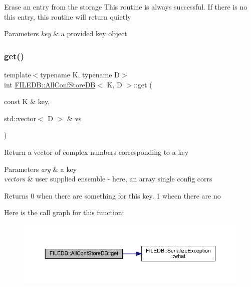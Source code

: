 Erase an entry from the storage This routine is always successful. If there is no this entry, this routine will return quietly 
\begin{DoxyParams}{Parameters}
{\em key} & a provided key object \\
\hline
\end{DoxyParams}
\mbox{\label{classFILEDB_1_1AllConfStoreDB_a848466f7dce25cacc4e8560c50240d35}} 
\subsubsection{\texorpdfstring{get()}{get()}\hspace{0.1cm}{\footnotesize\ttfamily [1/3]}}
{\footnotesize\ttfamily template$<$typename K, typename D$>$ \\
int \mbox{\hyperlink{classFILEDB_1_1AllConfStoreDB}{F\+I\+L\+E\+D\+B\+::\+All\+Conf\+Store\+DB}}$<$ K, D $>$\+::get (\begin{DoxyParamCaption}\item[{const K \&}]{key,  }\item[{std\+::vector$<$ D $>$ \&}]{vs }\end{DoxyParamCaption})\hspace{0.3cm}{\ttfamily [inline]}}

Return a vector of complex numbers corresponding to a key 
\begin{DoxyParams}{Parameters}
{\em arg} & a key \\
\hline
{\em vectors} & user supplied ensemble -\/ here, an array single config corrs \\
\hline
\end{DoxyParams}
\begin{DoxyReturn}{Returns}
0 when there are something for this key. 1 wheen there are no 
\end{DoxyReturn}
Here is the call graph for this function\+:
\nopagebreak
\begin{figure}[H]
\begin{center}
\leavevmode
\includegraphics[width=350pt]{df/db6/classFILEDB_1_1AllConfStoreDB_a848466f7dce25cacc4e8560c50240d35_cgraph}
\end{center}
\end{figure}
\mbox{\label{classFILEDB_1_1AllConfStoreDB_a848466f7dce25cacc4e8560c50240d35}} 

